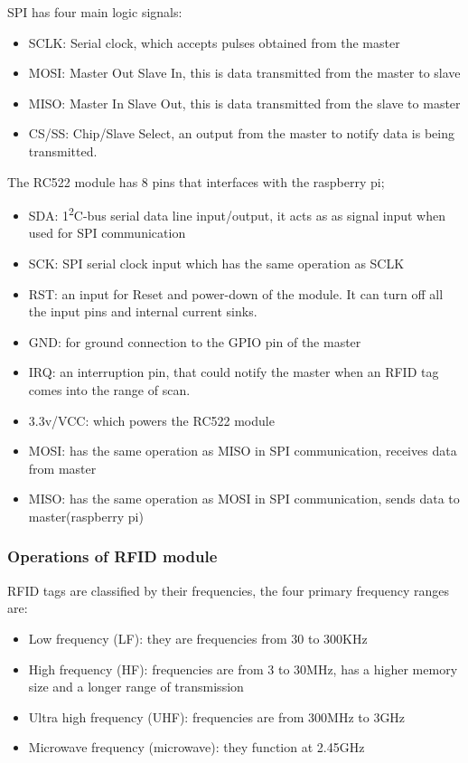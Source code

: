 SPI has four main logic signals: 
\begin{itemize}
  \item SCLK: Serial clock, which accepts pulses obtained from the master
  \item MOSI: Master Out Slave In, this is data transmitted from the master to slave
  \item MISO: Master In Slave Out, this is data transmitted from the slave to master
  \item CS/SS: Chip/Slave Select, an output from the master to notify data is being transmitted.
\end{itemize}

The RC522 module has 8 pins that interfaces with the raspberry pi;
\begin{itemize}
  \item SDA: 1\textsuperscript{2}C-bus serial data line input/output, it acts as as signal input when used for SPI communication
  \item SCK: SPI serial clock input which has the same operation as SCLK
  \item RST: an input for Reset and power-down of the module. It can turn off all the input pins and internal current sinks. 
  \item GND: for ground connection to the GPIO pin of the master
  \item IRQ: an interruption pin, that could notify the master when an RFID tag comes into the range of scan.
  \item 3.3v/VCC: which powers the RC522 module
  \item MOSI: has the same operation as MISO in SPI communication, receives data from master
  \item MISO: has the same operation as MOSI in SPI communication, sends data to master(raspberry pi)
\end{itemize}

\subsubsection{Operations of RFID module}
RFID tags are classified by their frequencies, the four primary frequency ranges are:
\begin{itemize}
  \item Low frequency (LF): they are frequencies from 30 to 300KHz
  \item High frequency (HF): frequencies are from 3 to 30MHz, has a higher memory size and a longer range of transmission
  \item Ultra high frequency (UHF): frequencies are from 300MHz to 3GHz
  \item Microwave frequency (microwave): they function at 2.45GHz 
\end{itemize}

